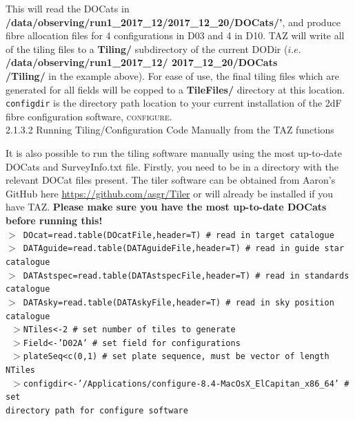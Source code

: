\documentclass[12pt]{article}
\begin{document}
This will read the DOCats in \textbf{/data/observing/run1\_2017\_12/2017\_12\_20/DOCats/'}, and produce fibre allocation files for 4 configurations in D03 and 4 in D10. TAZ will write all of the tiling files to a \textbf{Tiling/} subdirectory of the current DODir ($i.e.$ \textbf{/data/observing/run1\_2017\_12/ 2017\_12\_20/DOCats \\ /Tiling/} in the example above). For ease of use, the final tiling files which are generated for all fields will be copped to a  \textbf{TileFiles/} directory at this location. \texttt{configdir} is the directory path location to your current installation of the 2dF fibre configuration software, \textsc{configure}. \\

\textsf{2.1.3.2 Running Tiling/Configuration Code Manually from the TAZ functions}
\vspace{2mm}

It is also possible to run the tiling software manually using the most up-to-date DOCats and SurveyInfo.txt file. Firstly, you need to be in a directory with the relevant DOCat files present. The tiler software can be obtained from Aaron's GitHub here \url{https://github.com/asgr/Tiler} or will already be installed if you have TAZ. \textbf{\textcolor{PineGreen}{Please make sure you have the most up-to-date DOCats before running this!}}   \\

\texttt{$>$ DOcat=read.table(DOcatFile,header=T) \# read in target catalogue}\\
\texttt{$>$ DATAguide=read.table(DATAguideFile,header=T)  \# read in guide star catalogue}\\
\texttt{$>$ DATAstspec=read.table(DATAstspecFile,header=T) \# read in standards catalogue}\\
\texttt{$>$ DATAsky=read.table(DATAskyFile,header=T) \# read in sky position catalogue}\\

\texttt{ $>$NTiles<-2 \# set number of tiles to generate }\\
\texttt{ $>$Field<-'D02A'  \# set field for configurations}\\
\texttt{ $>$plateSeq<c(0,1) \# set plate sequence, must be vector of length NTiles}\\
\texttt{ $>$configdir<-'/Applications/configure-8.4-MacOsX\_ElCapitan\_x86\_64'  \# set \\ directory path for configure software}\\
\end{document}
